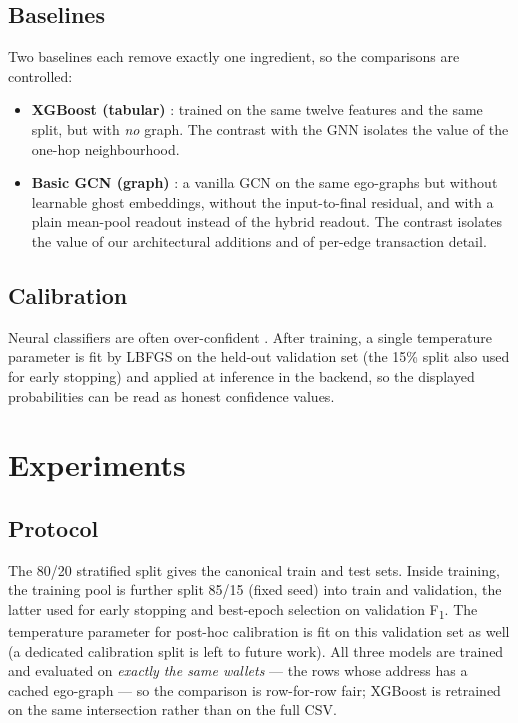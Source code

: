 \documentclass[12pt,a4paper,openany]{report}
\begin{document}
\section{Baselines}
Two baselines each remove exactly one ingredient, so the comparisons are controlled:
\begin{itemize}[leftmargin=1.4em,itemsep=2pt]
  \item \textbf{XGBoost (tabular)} \citep{chen2016xgboost}: trained on the same twelve features
    and the same split, but with \emph{no} graph. The contrast with the GNN isolates the value
    of the one-hop neighbourhood.
  \item \textbf{Basic GCN (graph)} \citep{kipf2017gcn}: a vanilla GCN on the same ego-graphs
    but without learnable ghost embeddings, without the input-to-final residual, and with a plain
    mean-pool readout instead of the hybrid readout. The contrast isolates the value of our
    architectural additions and of per-edge transaction detail.
\end{itemize}

\section{Calibration}
Neural classifiers are often over-confident \citep{guo2017calibration}. After training, a single
temperature parameter is fit by LBFGS on the held-out validation set (the 15\% split also used
for early stopping) and applied at inference
in the backend, so the displayed probabilities can be read as honest
confidence values.

\chapter{Experiments}\label{ch:experiments}

\section{Protocol}
The 80/20 stratified split gives the canonical train and test sets. Inside training, the training
pool is further split 85/15 (fixed seed) into train and validation, the latter used for early
stopping and best-epoch selection on validation F\textsubscript{1}. The temperature parameter for
post-hoc calibration is fit on this validation set as well (a dedicated calibration split is
left to future work). All three models are trained and
evaluated on \emph{exactly the same wallets} --- the rows whose address has a cached
ego-graph --- so the comparison is row-for-row fair; XGBoost is retrained on the same
intersection rather than on the full CSV.
\end{document}
